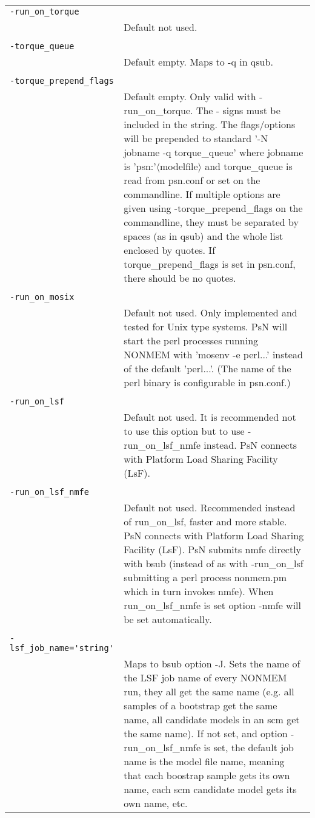\documentclass[a4paper,12pt]{article}
\begin{document}
\begin{longtable}{p{1in}p{4in}}
\verb|-run_on_torque| & \\
\nopagebreak
 & Default not used.  \\
\\
\verb|-torque_queue| & \\
\nopagebreak
 & Default empty. Maps to -q in qsub. \\
\\
\verb|-torque_prepend_flags| & \\
\nopagebreak
 & Default empty. Only valid with -run\_on\_torque. The - signs must be included in the string. The flags/options will be prepended to standard '-N jobname -q torque\_queue' where jobname is 'psn:'$\langle$modelfile$\rangle$ and torque\_queue is read from psn.conf or set on the commandline. If multiple options are given using -torque\_prepend\_flags on the commandline, they must be separated by spaces (as in qsub) and the whole list enclosed by quotes. If torque\_prepend\_flags is set in psn.conf, there should be no quotes. \\
\\
\verb|-run_on_mosix| & \\
\nopagebreak
 & Default not used. Only implemented and tested for Unix type systems. PsN will start the perl processes running NONMEM with 'mosenv -e perl...' instead of the default 'perl...'. (The name of the perl binary is configurable in psn.conf.) \\
\\
\verb|-run_on_lsf| & \\
\nopagebreak
 & Default not used. It is recommended not to use this option but to  use -run\_on\_lsf\_nmfe instead. PsN connects with Platform Load Sharing Facility (LsF).  \\
\\
\verb|-run_on_lsf_nmfe| & \\
\nopagebreak
 & Default not used. Recommended instead of run\_on\_lsf, faster and more stable. PsN connects with Platform Load Sharing Facility (LsF). PsN submits nmfe directly with bsub (instead of as with -run\_on\_lsf submitting a perl process nonmem.pm which in turn invokes nmfe). When run\_on\_lsf\_nmfe is set option -nmfe will be set automatically. \\
\\
\verb|-lsf_job_name='string'| & \\
\nopagebreak
 & Maps to bsub option -J. Sets the name of the LSF job name of every NONMEM run, they all get the same name (e.g. all samples of a bootstrap get the same name, all candidate models in an scm get the same name). If not set, and option -run\_on\_lsf\_nmfe is set, the default job name is the model file name, meaning that each boostrap sample gets its own name, each scm candidate model gets its own name, etc. \\

\end{longtable}
\end{document}
